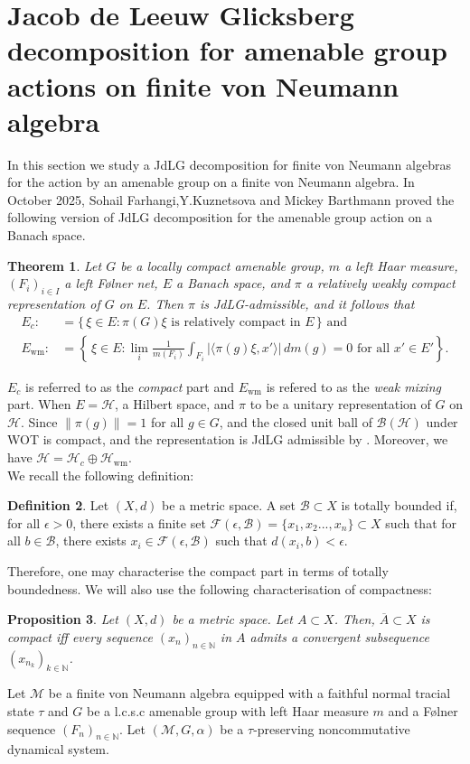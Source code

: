 \documentclass[11pt]{amsart}
\newtheorem{thm}{Theorem}[section]
\newtheorem{prop}[thm]{Proposition}
\theoremstyle{definition}
\newtheorem{defn}[thm]{Definition}
\theoremstyle{myremark}
\numberwithin{equation}{section}
\newcommand{\CB}{\mathcal{B}}
\newcommand{\CF}{\mathcal{F}}
\newcommand{\CH}{\mathcal{H}}
\newcommand{\CM}{\mathcal{M}}
\begin{document}





\section{\textbf{Jacob de Leeuw Glicksberg decomposition  for amenable group actions on  finite von Neumann algebra}}\label{JdLG}
\noindent In this section we study a JdLG decomposition for finite von Neumann algebras for the action by an amenable group on a finite von Neumann algebra.
In October 2025, Sohail Farhangi,Y.Kuznetsova and Mickey Barthmann proved the following version of JdLG decomposition for the amenable group action on a Banach space.
\begin{thm}\label{JdlG_decomposition}\cite{barthmann-farhangi-kuznetsova2025jacobsdeleeuwglicksbergdecomposition}
Let $G$ be a locally compact amenable group, $m$ a left Haar measure,
$ (F_i)_{i \in I}$ a left F\o lner net, $E$ a Banach space, and
$\pi$ a relatively weakly compact representation of $G$ on $E$.
Then $\pi$ is JdLG-admissible, and it follows that 
\begin{align*}
E_c :&= \{\, \xi \in E : \pi(G)\xi \text{ is relatively compact in } E \,\}  \text{ and }\\
E_{\mathrm{wm}} :&= \left\{\, \xi \in E :
\lim_{i} \frac{1}{m(F_i)}
\int_{F_i} \bigl| \langle \pi(g)\xi, x' \rangle \bigr| \, dm(g) = 0
\text{ for all } x' \in E' \right\}.
\end{align*}
\end{thm}
$E_c$ is referred to as the \emph{ compact } part and  $ E_{\mathrm{wm}}$ is refered to as the \emph{weak mixing} part.
 When  $E=\CH$, a Hilbert space, and $\pi$ to be a unitary representation of $G$ on $\CH$. Since $\| \pi(g) \|=1$ for all $g \in G$, and the closed unit ball of $\CB(\CH)$ under WOT is compact, and the representation is JdLG admissible by  \cite[Example 16.25, Chapter 16]{Eisner2015}. Moreover, we have $ \CH= \CH_c \oplus \CH_{\text{wm}}$.\\
 We recall the following definition:
 \begin{defn}
     Let $(X,d)$ be a metric space. A set $\CB \subset X$ is totally bounded if, for all $\epsilon >0$, there exists a finite set $\CF(\epsilon,\CB)=\{x_{1},x_2...,x_n\} \subset X$ such that for all $b \in \CB$, there exists $x_i \in \CF(\epsilon,\CB)$ such that $d(x_{i},b)<\epsilon.$
 \end{defn}
 Therefore,  one may characterise the compact part in terms of totally boundedness. We will also use the following characterisation of compactness:
 \begin{prop}\label{cptchar2}
Let $(X,d)$ be a metric space. Let $A \subset X$. Then, $\overline{A} \subset X$ is compact iff every sequence $(x_{n})_{n\in\mathbb{N}}$ in $A$ admits a convergent subsequence $(x_{n_k})_{k\in \mathbb{N}}$.
 \end{prop}
 Let $\CM$ be a finite von Neumann algebra equipped with a faithful normal tracial state $\tau$ and  $G$ be a l.c.s.c amenable group with left Haar measure $m$ and a F\o lner sequence $(F_n)_{n \in \mathbb{N}}$. Let $(\CM, G, \alpha)$ be a $\tau$-preserving noncommutative dynamical system.
\end{document}

